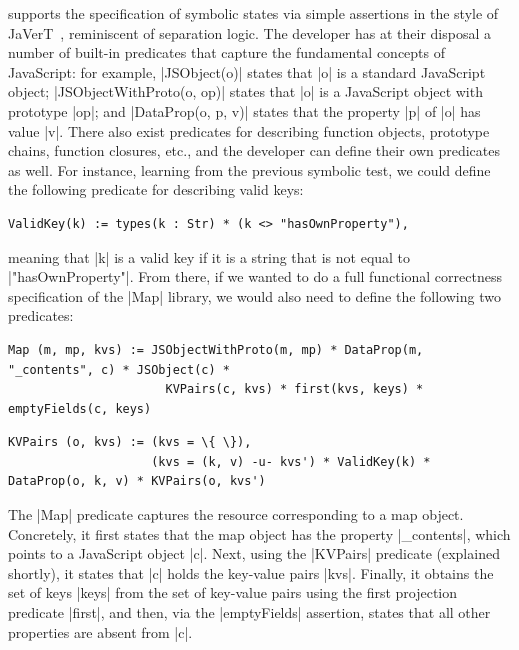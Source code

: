 \cosette supports the specification of symbolic states via simple assertions in the style of JaVerT~\cite{javert}, reminiscent of separation logic. The developer has at their disposal a number of built-in predicates that capture the fundamental concepts of JavaScript: for example, \jsinline|JSObject(o)| states that \jsinline|o| is a standard JavaScript object; \jsinline|JSObjectWithProto(o, op)| states that \jsinline|o| is a JavaScript object with prototype \jsinline|op|; and \jsinline|DataProp(o, p, v)| states that the property \jsinline|p| of \jsinline|o| has value \jsinline|v|. There also exist predicates for describing function objects, prototype chains, function closures, etc., and the developer can define their own predicates as well. For instance, learning from the previous symbolic test, we could define the following predicate for describing valid keys:
\begin{Verbatim}[fontsize=\small,commandchars=\\\{\}]
    ValidKey(k) := types(k : Str) * (k <> "hasOwnProperty"),
\end{Verbatim}
\noindent meaning that \jsinline|k| is a valid key if it is a string that is not equal to \jsinline|"hasOwnProperty"|. From there, if we wanted to do a full functional correctness specification of the \jsinline|Map| library, we would also need to define the following two predicates:


\smallskip
\begin{Verbatim}[fontsize=\footnotesize,commandchars=\\\{\}]
Map (m, mp, kvs) := JSObjectWithProto(m, mp) * DataProp(m, "_contents", c) * JSObject(c) * 
                      KVPairs(c, kvs) * first(kvs, keys) * emptyFields(c, keys)
\end{Verbatim}
\begin{Verbatim}[fontsize=\footnotesize,commandchars=\\\{\}]
KVPairs (o, kvs) := (kvs = \{ \}),
                    (kvs = (k, v) -u- kvs') * ValidKey(k) * DataProp(o, k, v) * KVPairs(o, kvs')
\end{Verbatim}

\smallskip
The \jsinline|Map| predicate captures the resource corresponding to a map object. 
Concretely, it first states that the map object has the property \jsinline|_contents|, which points to a  JavaScript object \jsinline|c|.
Next, using the \jsinline|KVPairs| predicate (explained shortly), it states that \jsinline|c| holds the key-value pairs \jsinline|kvs|. Finally, it obtains the set of keys \jsinline|keys| from the set of key-value pairs using the first projection predicate \jsinline|first|, and then, via the \jsinline|emptyFields| assertion, states that all other properties are absent from \jsinline|c|.

